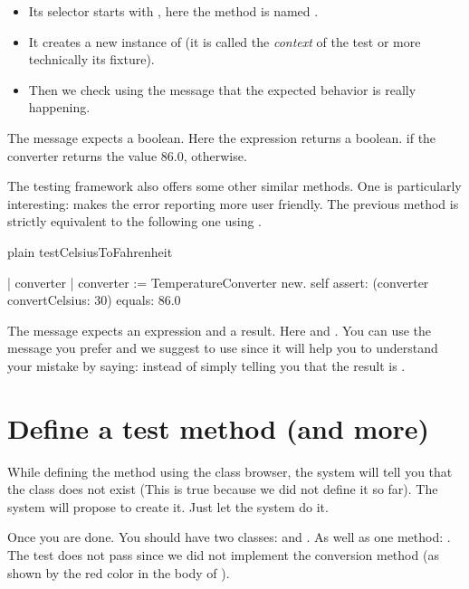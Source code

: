 \documentclass[10pt,twoside,english]{_support/latex/sbabook/sbabook}
\begin{document}
\begin{itemize}
\item Its selector starts with , here the method is named .
\item It creates a new instance of  (it is called the \textit{context} of the test or more technically its fixture).
\item Then we check using the message  that the expected behavior is really happening. 
\end{itemize}

The message  expects a boolean. Here the expression  returns a boolean.  if the converter returns the value 86.0,  otherwise. 

The testing framework also offers some other similar methods. One is particularly interesting:  makes the error reporting more user friendly. The previous method is strictly equivalent to the following one using . 

\begin{displaycode}{plain}
testCelsiusToFahrenheit

	| converter |
	converter := TemperatureConverter new. 
	self assert: (converter convertCelsius: 30) equals: 86.0
\end{displaycode}

The message  expects an expression and a result. Here  and . You can use the message you prefer and we suggest to use  since it will help you to understand your mistake by saying:  instead of simply telling you that the result is . 
\section{Define a test method (and more)}
While defining the method  using the class browser, the system will tell you that the class  does not exist (This is true because we did not define it so far). The system will propose to create it. Just let the system do it. 

Once you are done. You should have two classes:  and . As well as one method: . The test does not pass since we did not implement the conversion method (as shown by the red color in the body of ).
\end{document}
